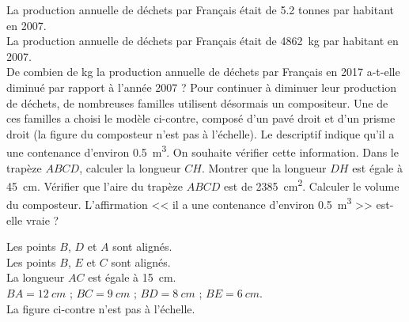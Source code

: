 \documentclass[11pt]{memoir}
\begin{document}
\begin{questions}

\exercice[18]
\par La production annuelle de déchets par Français était de \num{5,2} tonnes par habitant en 2007.\\
La production annuelle de déchets par Français était de \qty{4862}{kg} par habitant en 2007.\\
    \question De combien de \unit{kg} la production annuelle de déchets par Français en 2017 a-t-elle diminué par rapport à l'année 2007 ?
    \question Pour continuer à diminuer leur production de déchets, de nombreuses familles utilisent désormais un compositeur. Une de ces familles a choisi le modèle ci-contre, composé d'un pavé droit et d'un prisme droit (la figure du composteur n'est pas à l'échelle). Le descriptif indique qu'il a une contenance d'environ \qty{0.5}{\metre\cubed}. On souhaite vérifier cette information.
    \subpart Dans le trapèze $ABCD$, calculer la longueur $CH$.
    \subpart Montrer que la longueur $DH$ est égale à \qty{45}{\cm}.
    \subpart Vérifier que l'aire du trapèze $ABCD$ est de \qty{2385}{\cm\squared}.
    \subpart Calculer le volume du composteur. L'affirmation << il a une contenance d'environ \qty{0.5}{\m\cubed} >> est-elle vraie ?
    
    \begin{center}
    \end{center}

\begin{center}
\end{center}

\exercice[12]
\par Les points $B$, $D$ et $A$ sont alignés.\\
Les points $B$, $E$ et $C$ sont alignés.\\
La longueur $AC$ est égale à \qty{15}{\cm}.\\
$BA = \qty{12}{cm}$ ; $BC = \qty{9}{cm}$ ; $BD = \qty{8}{cm}$ ; $BE = \qty{6}{cm}$.\\
La figure ci-contre n'est pas à l'échelle.\\


\end{questions}
\end{document}
